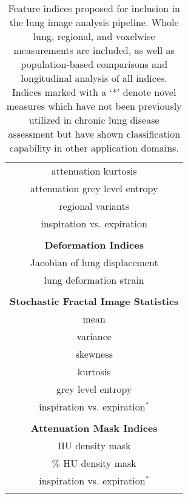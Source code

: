 \begin{table}[!t]
\begin{minipage}{0.33 \linewidth}
\begin{tabular}[t]{c}
    attenuation kurtosis  \\
    attenuation grey level entropy  \\
    regional variants  \\
    inspiration vs. expiration \\
    \\
    {\bf Deformation Indices}  {} \\
    \cmidrule[1pt](lr){1-1}
    Jacobian of lung displacement  \\
    lung deformation strain  \\
    \\
    {\bf Stochastic Fractal Image Statistics}\\
    \cmidrule[1pt](lr){1-1}
    mean  \\
    variance  \\
    skewness  \\
    kurtosis  \\
    grey level entropy  \\
    inspiration vs. expiration$^*$  \\
    \\
    {\bf Attenuation Mask Indices} \\
    \cmidrule[1pt](lr){1-1}
    HU density mask   \\
    $\%$ HU density mask  \\
    inspiration vs. expiration$^*$ \\
    \\
    \end{tabular}
   \end{minipage}
 \label{table:indices}
 \caption{Feature indices proposed for inclusion in the lung image analysis pipeline.  Whole lung, regional, and voxelwise measurements are included, as well as population-based comparisons and longitudinal analysis of all indices.  Indices marked with a `*' denote novel measures which have not been previously utilized in chronic lung disease assessment but have shown classification capability in other application domains.}
\end{table}
